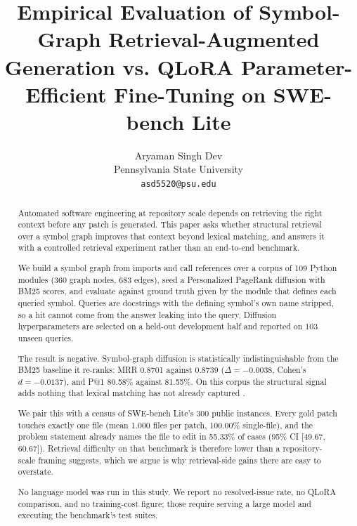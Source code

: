 \documentclass[10pt,twocolumn,letterpaper]{article}
\begin{document}
\title{Empirical Evaluation of Symbol-Graph Retrieval-Augmented Generation vs. QLoRA Parameter-Efficient Fine-Tuning on SWE-bench Lite}

\author{
Aryaman Singh Dev\\
Pennsylvania State University \\
\texttt{asd5520@psu.edu}
}

\maketitle

\begin{abstract}
Automated software engineering at repository scale depends on retrieving the right context before any patch is generated. This paper asks whether structural retrieval over a symbol graph improves that context beyond lexical matching, and answers it with a controlled retrieval experiment rather than an end-to-end benchmark.

We build a symbol graph from imports and call references over a corpus of 109 Python modules (360 graph nodes, 683 edges), seed a Personalized PageRank diffusion with BM25 scores, and evaluate against ground truth given by the module that defines each queried symbol. Queries are docstrings with the defining symbol's own name stripped, so a hit cannot come from the answer leaking into the query. Diffusion hyperparameters are selected on a held-out development half and reported on 103 unseen queries.

The result is negative. Symbol-graph diffusion is statistically indistinguishable from the BM25 baseline it re-ranks: MRR 0.8701 against 0.8739 ($\Delta = -0.0038$, Cohen's $d = -0.0137$), and P@1 80.58\% against 81.55\%. On this corpus the structural signal adds nothing that lexical matching has not already captured \cite{arxiv_2501_02497}.

We pair this with a census of SWE-bench Lite's 300 public instances. Every gold patch touches exactly one file (mean 1.000 files per patch, 100.00\% single-file), and the problem statement already names the file to edit in 55.33\% of cases (95\% CI [49.67, 60.67]). Retrieval difficulty on that benchmark is therefore lower than a repository-scale framing suggests, which we argue is why retrieval-side gains there are easy to overstate.

No language model was run in this study. We report no resolved-issue rate, no QLoRA comparison, and no training-cost figure; those require serving a large model and executing the benchmark's test suites.
\end{abstract}
\end{document}

